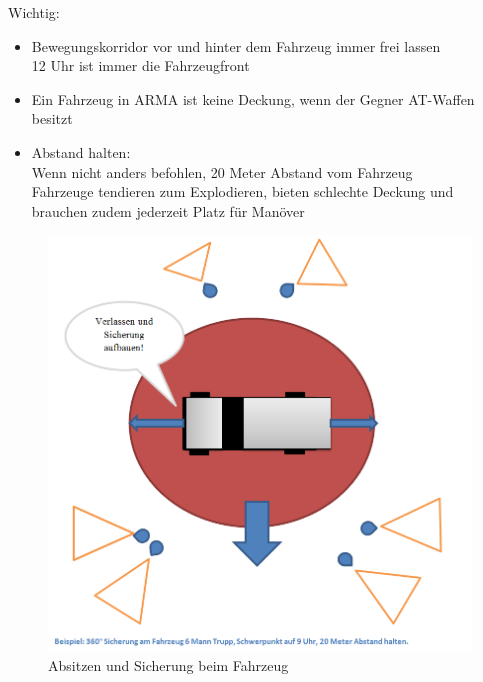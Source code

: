 	Wichtig:
	\begin{itemize}
		\item Bewegungskorridor vor und hinter dem Fahrzeug immer frei lassen\\ 12 Uhr ist immer die Fahrzeugfront
		\item Ein Fahrzeug in ARMA ist keine Deckung, wenn der Gegner AT-Waffen besitzt
		\item Abstand halten:\\ Wenn nicht anders befohlen, 20 Meter Abstand vom Fahrzeug\\ Fahrzeuge tendieren zum Explodieren, bieten schlechte Deckung und brauchen zudem jederzeit Platz für Manöver
	\end{itemize}
	\begin{figure}[htbp]
		\centering
		\includegraphics[width=15cm]{./Grafiken/Abschnitt/Fahrzeug_verlassen.png}
		\caption{Absitzen und Sicherung beim Fahrzeug}
	\end{figure}
